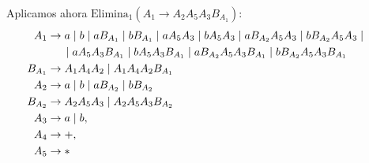 \documentclass[12pt]{article}
\begin{document}
\begin{ejercicio}[2.5 puntos]
\begin{description}
        Aplicamos ahora $\text{Elimina}_1(A_1\rightarrow A_2 A_5 A_3 B_{A_1})$:
        \begin{align*}
            \hspace{-2.5cm}A_1 &\to  a \mid b\mid a B_{A_1} \mid b B_{A_1}
                \mid  aA_5A_3 \mid bA_5A_3 \mid   a B_{A_2}A_5A_3 \mid  b B_{A_2}A_5A_3
                \mid \\ & \hspace{0.5cm} \mid  aA_5 A_3 B_{A_1} \mid bA_5 A_3 B_{A_1} \mid   a B_{A_2}A_5 A_3 B_{A_1}
                \mid  b B_{A_2}A_5 A_3 B_{A_1} \\
            \hspace{-2.5cm}B_{A_1} &\to A_1 A_4 A_2 \mid A_1 A_4 A_2 B_{A_1} \\
            \hspace{-2.5cm}A_2 &\to  a \mid b \mid   a B_{A_2} \mid  b B_{A_2} \\
            \hspace{-2.5cm}B_{A_2} & \to A_2 A_5 A_3 \mid A_2 A_5 A_3 B_{A_2}\\
            \hspace{-2.5cm}A_3 &\to  a \mid b,\\
            \hspace{-2.5cm}A_4 &\to +,\\
            \hspace{-2.5cm}A_5 &\to *
        \end{align*}


\end{description}
\end{ejercicio}
\end{document}
